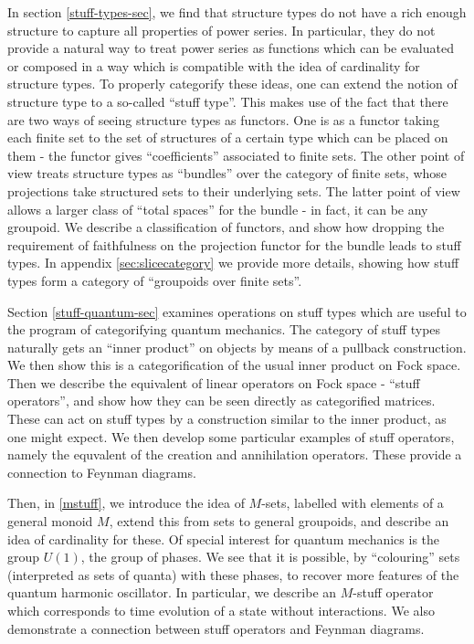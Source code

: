 \documentclass{amsart} \usepackage{amsmath,amssymb,bbm}
\begin{document}
In section \ref{stuff-types-sec}, we find that structure types do not
have a rich enough structure to capture all properties of power
series.  In particular, they do not provide a natural way to treat
power series as functions which can be evaluated or composed in a way
which is compatible with the idea of cardinality for structure types.
To properly categorify these ideas, one can extend the notion of
structure type to a so-called ``stuff type''.  This makes use of the
fact that there are two ways of seeing structure types as functors.
One is as a functor taking each finite set to the set of structures of
a certain type which can be placed on them - the functor gives
``coefficients'' associated to finite sets.  The other point of view
treats structure types as ``bundles'' over the category of finite
sets, whose projections take structured sets to their underlying sets.
The latter point of view allows a larger class of ``total spaces'' for
the bundle - in fact, it can be any groupoid.  We describe a
classification of functors, and show how dropping the requirement of
faithfulness on the projection functor for the bundle leads to stuff
types.  In appendix \ref{sec:slicecategory} we provide more details,
showing how stuff types form a category of ``groupoids over finite
sets''.

Section \ref{stuff-quantum-sec} examines operations on stuff types
which are useful to the program of categorifying quantum mechanics.
The category of stuff types naturally gets an ``inner product'' on
objects by means of a pullback construction.  We then show this is a
categorification of the usual inner product on Fock space.  Then we
describe the equivalent of linear operators on Fock space - ``stuff
operators'', and show how they can be seen directly as categorified
matrices.  These can act on stuff types by a construction similar to
the inner product, as one might expect.  We then develop some
particular examples of stuff operators, namely the equvalent of the
creation and annihilation operators.  These provide a connection to
Feynman diagrams.

Then, in \ref{mstuff}, we introduce the idea of $M$-sets, labelled
with elements of a general monoid $M$, extend this from sets to
general groupoids, and describe an idea of cardinality for these.  Of
special interest for quantum mechanics is the group $U(1)$, the group
of phases.  We see that it is possible, by ``colouring'' sets
(interpreted as sets of quanta) with these phases, to recover more
features of the quantum harmonic oscillator.  In particular, we
describe an $M$-stuff operator which corresponds to time evolution of
a state without interactions.  We also demonstrate a connection
between stuff operators and Feynman diagrams.
\end{document}
